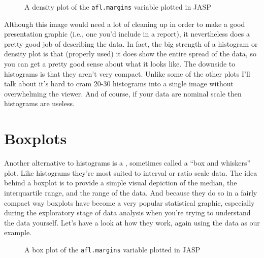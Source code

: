 \begin{figure}[ht]
\begin{center}
\caption{A density plot of the \texttt{afl.margins} variable plotted in JASP}
\label{fig:histogram2}
\HR
\end{center}
\end{figure}

Although this image would need a lot of cleaning up in order to make a good presentation graphic (i.e., one you'd include in a report), it nevertheless does a pretty good job of describing the data. In fact, the big strength of a histogram or density plot is that (properly used) it does show the entire spread of the data, so you can get a pretty good sense about what it looks like. The downside to histograms is that they aren't very compact. Unlike some of the other plots I'll talk about it's hard to cram 20-30 histograms into a single image without overwhelming the viewer. And of course, if your data are nominal scale then histograms are useless.


\section{Boxplots~\label{sec:boxplots}}

Another alternative to histograms is a , sometimes called a ``box and whiskers'' plot. Like histograms they're most suited to interval or ratio scale data. The idea behind a boxplot is to provide a simple visual depiction of the median, the interquartile range, and the range of the data. And because they do so in a fairly compact way boxplots have become a very popular statistical graphic, especially during the exploratory stage of data analysis when you're trying to understand the data yourself. Let's have a look at how they work, again using the  data as our example.

\begin{figure}[!!htb]
\begin{center}
\caption{A box plot of the \texttt{afl.margins} variable plotted in JASP}
\label{fig:boxplot1}
\HR
\end{center}
\end{figure}
 
